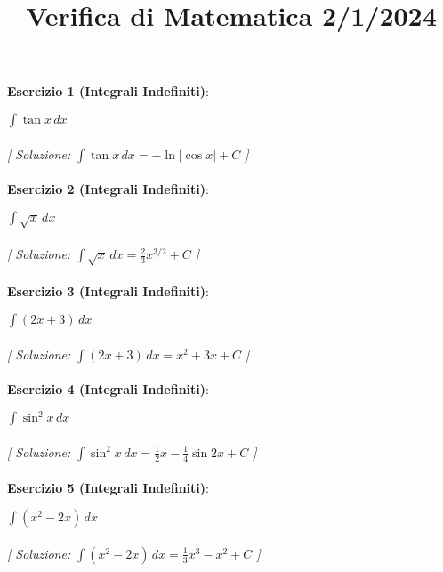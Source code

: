 \documentclass{article}
\title{\raggedright Verifica di Matematica  2/1/2024}
\date{}
\begin{document}
\maketitle

\textbf{Esercizio 1 (Integrali Indefiniti)}:\\
\par $\int \tan x \,dx$ \\\\

\textit{[ Soluzione: $\int \tan x \,dx = -\ln |\cos x| + C$ ]}\\\\

\textbf{Esercizio 2 (Integrali Indefiniti)}:\\
\par $\int \sqrt{x} \,dx$ \\\\

\textit{[ Soluzione: $\int \sqrt{x} \,dx = \frac{2}{3}x^{3/2} + C$ ]}\\\\

\textbf{Esercizio 3 (Integrali Indefiniti)}:\\
\par $\int (2x + 3) \,dx$ \\\\

\textit{[ Soluzione: $\int (2x + 3) \,dx = x^2 + 3x + C$ ]}\\\\

\textbf{Esercizio 4 (Integrali Indefiniti)}:\\
\par $\int \sin^2 x \,dx$ \\\\

\textit{[ Soluzione: $\int \sin^2 x \,dx = \frac{1}{2}x - \frac{1}{4}\sin 2x + C$ ]}\\\\

\textbf{Esercizio 5 (Integrali Indefiniti)}:\\
\par $\int (x^2 - 2x) \,dx$ \\\\

\textit{[ Soluzione: $\int (x^2 - 2x) \,dx = \frac{1}{3}x^3 - x^2 + C$ ]}\\\\
\end{document}
